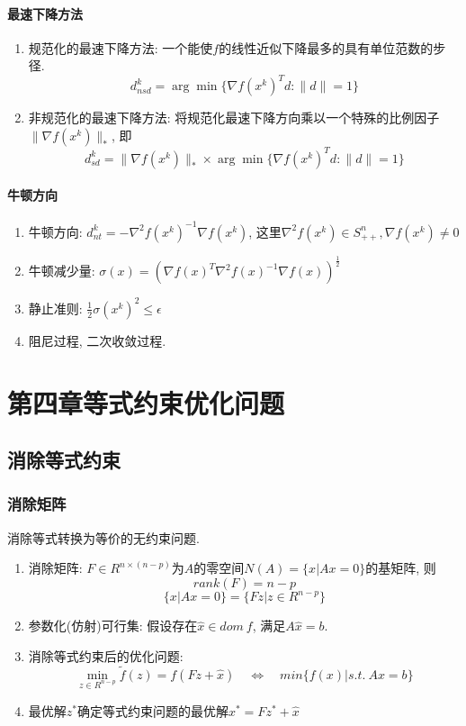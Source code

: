 \documentclass[UTF8]{article}
\begin{document}
		\paragraph{最速下降方法}
		\begin{enumerate}
	\item 规范化的最速下降方法: 一个能使$f$的线性近似下降最多的具有单位范数的步径. $$d_{nsd}^k = \arg\min\{\nabla f(x^k)^T d:\lVert d \rVert = 1\}$$
	\item 非规范化的最速下降方法: 将规范化最速下降方向乘以一个特殊的比例因子$\lVert \nabla f(x^k)\rVert_*$, 即$$d_{sd}^k = \lVert \nabla f(x^k)\rVert_* \times \arg\min\{\nabla f(x^k)^T d:\lVert d \rVert = 1\}$$
\end{enumerate}

		\paragraph{牛顿方向}
\begin{enumerate}
	\item 牛顿方向: $d_{nt}^k = -\nabla^2 f(x^k)^{-1} \nabla f(x^k)$, 这里$\nabla^2 f(x^k) \in S^n_{++}, \nabla f(x^k)\neq 0$
	\item 牛顿减少量: $\sigma(x) = (\nabla f(x)^T \nabla^2 f(x)^{-1} \nabla f(x))^{\frac{1}{2}}$
	\item 静止准则: $\frac{1}{2}\sigma(x^k)^2\leq \epsilon$
	\item 阻尼过程, 二次收敛过程.
	
\end{enumerate}
	


\section{第四章\quad 等式约束优化问题}
\subsection{消除等式约束}
	
		\subsubsection{消除矩阵}
		消除等式转换为等价的无约束问题.
\begin{enumerate}
	\item 消除矩阵: $F\in R^{n\times (n-p)}$为$A$的零空间$N(A)=\{x|Ax=0\}$的基矩阵, 则
	$$rank(F)=n-p$$
	$$\{x|Ax=0\}=\{Fz|z\in R^{n-p}\}$$
	\item 参数化(仿射)可行集: 假设存在$\hat{x}\in dom\ f$, 满足$A\hat{x}=b$.
	\item 消除等式约束后的优化问题: $$\min\limits_{z\in R^{n-p}} \tilde{f}(z)=f(Fz+\hat{x})\quad\Leftrightarrow\quad min\{f(x)|s.t.\ Ax=b\}$$ 
	\item 最优解$z^*$确定等式约束问题的最优解$x^*=Fz^*+\hat{x}$
\end{enumerate}
\end{document}
